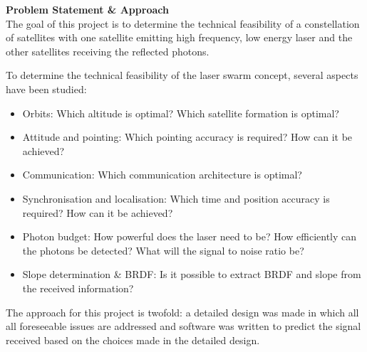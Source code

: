 \textbf{Problem Statement \& Approach}\\
The goal of this project is to determine the technical feasibility of a constellation of satellites with one satellite emitting high frequency, low energy laser and the other satellites receiving the reflected photons.

To determine the technical feasibility of the laser swarm concept, several aspects have been studied:

\begin{itemize}
\item Orbits: Which altitude is optimal? Which satellite formation is optimal?
\item Attitude and pointing: Which pointing accuracy is required? How can it be achieved?
\item Communication: Which communication architecture is optimal?
\item Synchronisation and localisation: Which time and position accuracy is required? How can it be achieved?
\item Photon budget: How powerful does the laser need to be? How efficiently can the photons be detected? What will the signal to noise ratio be?
\item Slope determination \& BRDF: Is it possible to extract BRDF and slope from the received information?
\end{itemize}

The approach for this project is twofold: a detailed design was made in which all all foreseeable issues are addressed and software was written to predict the signal received based on the choices made in the detailed design.